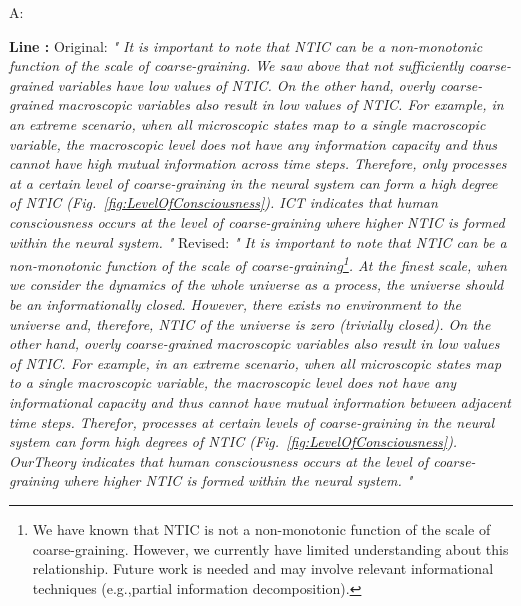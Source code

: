 \documentclass[utf8]{article}
\newenvironment{ans}  
    {\color{Black}\noindent A:}
    {~\newline}
\newcommand{\revise}[3]{
	\newline
	\newline
    \noindent
    \textbf{Line #1:}
    \newline
    Original:\newline
    \textit{"#2"}
    \newline
    \newline
    Revised:\newline
    \textit{"#3"}\newline}
\begin{document}
\begin{ans}
		\revise{}
		{
			It is important to note that NTIC can be a non-monotonic function of the scale of coarse-graining. We saw above that not sufficiently coarse-grained variables have low values of NTIC. On the other hand, overly coarse-grained macroscopic variables  also result in low values of NTIC. For example, in an extreme scenario, when all microscopic states map to a single macroscopic variable, the macroscopic level does not have any information capacity and thus cannot have high mutual information across time steps. Therefore, only processes at a certain level of coarse-graining in the neural system can form a high degree of NTIC (Fig.~\ref{fig:LevelOfConsciousness}). ICT indicates that human consciousness occurs at the level of coarse-graining where higher NTIC is formed within the neural system.
		}
		{
			It is important to note that NTIC can be a non-monotonic function of the scale of coarse-graining\footnote{We have known that NTIC is not a non-monotonic function of the scale of coarse-graining. However, we currently have limited understanding about this relationship. Future work is needed and may involve relevant informational techniques (e.g.,partial information decomposition).}. At the finest scale, when we consider the dynamics of the whole universe as a process, the universe should be an informationally closed. However, there exists no environment to the universe and, therefore, NTIC of the universe is zero (trivially closed). On the other hand, overly coarse-grained macroscopic variables  also result in low values of NTIC. For example, in an extreme scenario, when all microscopic states map to a single macroscopic variable, the macroscopic level does not have any informational capacity and thus cannot have  mutual information between adjacent time steps.  Therefor, processes at certain levels of coarse-graining in the neural system can form high degrees of NTIC (Fig.~\ref{fig:LevelOfConsciousness}). \ac{OurTheory} indicates that human consciousness occurs at the level of coarse-graining where higher NTIC is formed within the neural system. 
		}	    		
    	\end{ans}
    
\end{document}
